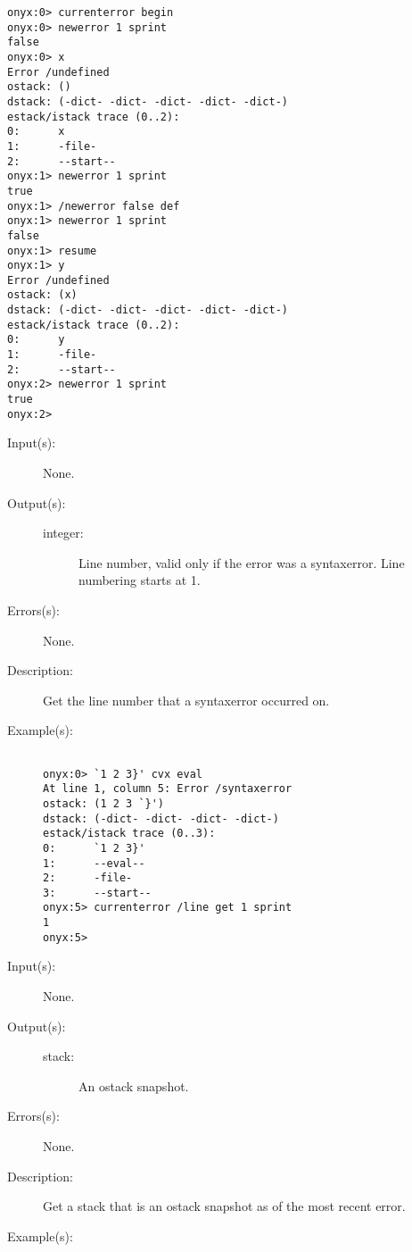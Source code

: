 \begin{description}
\begin{description}
\begin{verbatim}
onyx:0> currenterror begin
onyx:0> newerror 1 sprint
false
onyx:0> x
Error /undefined
ostack: ()
dstack: (-dict- -dict- -dict- -dict- -dict-)
estack/istack trace (0..2):
0:      x
1:      -file-
2:      --start--
onyx:1> newerror 1 sprint
true
onyx:1> /newerror false def
onyx:1> newerror 1 sprint
false
onyx:1> resume
onyx:1> y
Error /undefined
ostack: (x)
dstack: (-dict- -dict- -dict- -dict- -dict-)
estack/istack trace (0..2):
0:      y
1:      -file-
2:      --start--
onyx:2> newerror 1 sprint
true
onyx:2>
		\end{verbatim}
	\end{description}
\label{currenterror:line}
\item[{\onyxop{--}{line}{integer}}: ]
	\begin{description}\item[]
	\item[Input(s): ] None.
	\item[Output(s): ]
		\begin{description}\item[]
		\item[integer: ]
			Line number, valid only if the error was a syntaxerror.
			Line numbering starts at 1.
		\end{description}
	\item[Errors(s): ] None.
	\item[Description: ]
		Get the line number that a syntaxerror occurred on.
	\item[Example(s): ]\begin{verbatim}

onyx:0> `1 2 3}' cvx eval
At line 1, column 5: Error /syntaxerror
ostack: (1 2 3 `}')
dstack: (-dict- -dict- -dict- -dict-)
estack/istack trace (0..3):
0:      `1 2 3}'
1:      --eval--
2:      -file-
3:      --start--
onyx:5> currenterror /line get 1 sprint
1
onyx:5>
		\end{verbatim}
	\end{description}
\label{currenterror:ostack}
\item[{\onyxop{--}{ostack}{stack}}: ]
	\begin{description}\item[]
	\item[Input(s): ] None.
	\item[Output(s): ]
		\begin{description}\item[]
		\item[stack: ]
			An ostack snapshot.
		\end{description}
	\item[Errors(s): ] None.
	\item[Description: ]
		Get a stack that is an ostack snapshot as of the most recent
		error.
	\item[Example(s): ]\begin{verbatim}


\end{verbatim}
\end{description}
\end{description}
